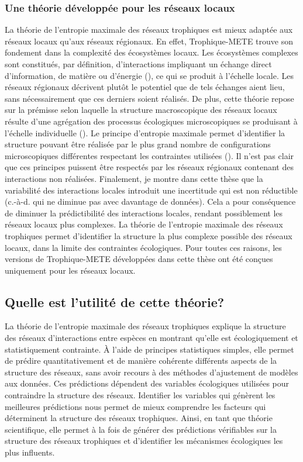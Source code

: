\subsubsection{Une théorie développée pour les réseaux locaux} 

La théorie de l'entropie maximale des réseaux trophiques est mieux adaptée aux
réseaux locaux qu'aux réseaux régionaux. En effet, Trophique-METE trouve son
fondement dans la complexité des écosystèmes locaux. Les écosystèmes complexes
sont constitués, par définition, d'interactions impliquant un échange direct
d'information, de matière ou d'énergie (\cite{Ladyman2013What}), ce qui se
produit à l'échelle locale. Les réseaux régionaux décrivent plutôt le potentiel
que de tels échanges aient lieu, sans nécessairement que ces derniers soient
réalisés. De plus, cette théorie repose sur la prémisse selon laquelle la
structure macroscopique des réseaux locaux résulte d'une agrégation des
processus écologiques microscopiques se produisant à l'échelle individuelle
(\cite{Frank2009Common}). Le principe d'entropie maximale permet d'identifier la
structure pouvant être réalisée par le plus grand nombre de configurations
microscopiques différentes respectant les contraintes utilisées
(\cite{Dewar2008Statistical}). Il n'est pas clair que ces principes puissent
être respectés par les réseaux régionaux contenant des interactions non
réalisées. Finalement, je montre dans cette thèse que la variabilité des
interactions locales introduit une incertitude qui est non réductible (c.-à-d.
qui ne diminue pas avec davantage de données). Cela a pour conséquence de
diminuer la prédictibilité des interactions locales, rendant possiblement les
réseaux locaux plus complexes. La théorie de l'entropie maximale des réseaux
trophiques permet d'identifier la structure la plus complexe possible des
réseaux locaux, dans la limite des contraintes écologiques. Pour toutes ces
raisons, les versions de Trophique-METE développées dans cette thèse ont été
conçues uniquement pour les réseaux locaux. 

\subsection{Quelle est l'utilité de cette théorie?} 

La théorie de l'entropie maximale des réseaux trophiques explique la structure
des réseaux d'interactions entre espèces en montrant qu'elle est écologiquement
et statistiquement contrainte. À l'aide de principes statistiques simples, elle
permet de prédire quantitativement et de manière cohérente différents aspects de
la structure des réseaux, sans avoir recours à des méthodes d'ajustement de
modèles aux données. Ces prédictions dépendent des variables écologiques
utilisées pour contraindre la structure des réseaux. Identifier les variables
qui génèrent les meilleures prédictions nous permet de mieux comprendre les
facteurs qui déterminent la structure des réseaux trophiques. Ainsi, en tant que
théorie scientifique, elle permet à la fois de générer des prédictions
vérifiables sur la structure des réseaux trophiques et d'identifier les
mécanismes écologiques les plus influents. 

